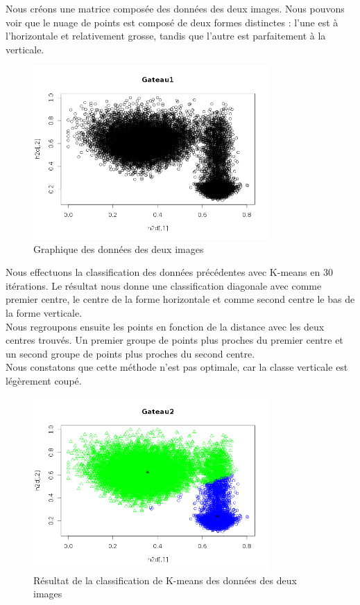 \documentclass[a4paper,11pt]{article}
\begin{document}
  Nous créons une matrice composée des données des deux images. Nous pouvons voir que le nuage
  de points est composé de deux formes distinctes : l'une est à l'horizontale et relativement grosse, tandis 
  que l'autre est parfaitement à la verticale.
  
  \begin{figure}[H]
    \center
    \includegraphics[width=9cm]{resultat/image_combine.png}
    \caption{Graphique des données des deux images}
  \end{figure}
  
  Nous effectuons la classification des données précédentes avec K-means en 30 itérations. Le résultat
  nous donne une classification diagonale avec comme premier centre, le centre de la forme horizontale et 
  comme second centre le bas de la forme verticale.\\
  
  Nous regroupons ensuite les points en fonction de la distance avec les deux centres trouvés. 
  Un premier groupe de points plus proches du premier centre et un second groupe de points plus 
  proches du second centre.\\
  
  Nous constatons que cette méthode n'est pas optimale, car la classe verticale est légèrement coupé.\\
  
  \begin{figure}[H]
    \center
    \includegraphics[width=9cm]{resultat/classification_gateau.png}
    \caption{Résultat de la classification de K-means des données des deux images}
  \end{figure}
  
\end{document}
